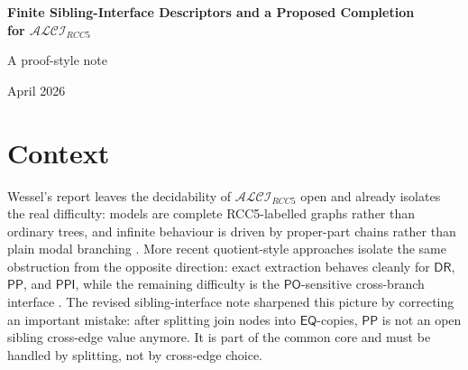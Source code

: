 \documentclass[11pt]{article}
\theoremstyle{remark}
\newcommand{\DR}{\mathsf{DR}}
\newcommand{\PO}{\mathsf{PO}}
\newcommand{\PP}{\mathsf{PP}}
\newcommand{\PPI}{\mathsf{PPI}}
\newcommand{\EQ}{\mathsf{EQ}}
\newcommand{\Core}{\mathsf{Core}}
\newcommand{\Out}{\mathsf{Out}}
\newcommand{\Front}{\mathsf{Front}}
\newcommand{\md}{\operatorname{md}}
\begin{document}
\begin{center}
{\LARGE\bfseries Finite Sibling-Interface Descriptors and a Proposed Completion\\[0.2em]
for $\mathcal{ALCI}_{RCC5}$\par}
\vspace{0.75em}
{\normalsize A proof-style note}\par
\vspace{0.45em}
{\small April 2026}
\end{center}

\begin{abstract}
This note continues the revised sibling-interface proposal for $\mathcal{ALCI}_{RCC5}$ and turns its open patchwork conjecture into an explicit theorem at the level of finite-prefix disjunctive networks. The key correction from the earlier note is retained: after splitting common descendants into $\EQ$-mates, $\PP$ is no longer an open sibling cross-edge option. The post-split interface is organized into three statuses: $\Core$ (common descendants, handled by $\EQ$), $\Out$ (already forced to be $\DR$ from the opposite subtree), and $\Front$ (still in the genuinely open $\DR/\PO$ zone). We define a locally coherent finite descriptor language, assign disjunctive RCC5 domains to all finite partial unfoldings, prove non-emptiness under arc-consistency by a least-common-ancestor induction, and then use full tractability of disjunctive RCC5 networks plus K"onig's lemma to obtain a weak-$\EQ$ model. Quotienting by $\EQ$ yields a strong-$\EQ$ model. Combined with the finite-index lemma and the standard extraction of rank-$d$ states, where $d=\md(C_0)$, this gives a finite quotient search procedure for concept satisfiability. The note is intended as a proof-style completion of the revised sibling-interface program; the extraction of witness menus from a model is condensed but finite throughout.
\end{abstract}

\section{Context}

Wessel's report leaves the decidability of $\mathcal{ALCI}_{RCC5}$ open and already isolates the real difficulty: models are complete RCC5-labelled graphs rather than ordinary trees, and infinite behaviour is driven by proper-part chains rather than plain modal branching \cite{Wessel2003}. More recent quotient-style approaches isolate the same obstruction from the opposite direction: exact extraction behaves cleanly for $\DR$, $\PP$, and $\PPI$, while the remaining difficulty is the $\PO$-sensitive cross-branch interface \cite{TwoTier3}. The revised sibling-interface note sharpened this picture by correcting an important mistake: after splitting join nodes into $\EQ$-copies, $\PP$ is not an open sibling cross-edge value anymore. It is part of the common core and must be handled by splitting, not by cross-edge choice.
\end{document}
